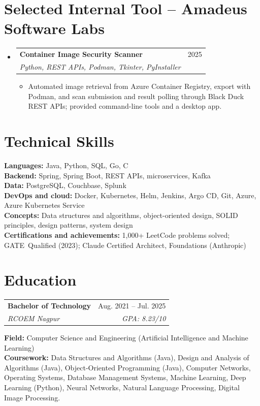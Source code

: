 \documentclass[a4paper,11pt]{article}
\makeatletter
\newcommand{\entry}[4]{\item\begin{tabularx}{\textwidth}{@{}Xr@{}}\textbf{#1}& #2\\\textit{\small #3}&\textit{\small #4}\end{tabularx}\vspace{-5pt}}
\newcommand{\bulletpoint}[1]{\item\small{#1}}
\makeatother
\begin{document}
\section{Selected Internal Tool -- Amadeus Software Labs}
\begin{itemize}[leftmargin=0in,label={}]
  \entry{Container Image Security Scanner}{2025}{Python, REST APIs, Podman, Tkinter, PyInstaller}{}
  \begin{itemize}
    \bulletpoint{Automated image retrieval from Azure Container Registry, export with Podman, and scan submission and result polling through Black Duck REST APIs; provided command-line tools and a desktop app.}
  \end{itemize}
\end{itemize}

\section{Technical Skills}
\small\textbf{Languages:} Java, Python, SQL, Go, C \\
\textbf{Backend:} Spring, Spring Boot, REST APIs, microservices, Kafka \\
\textbf{Data:} PostgreSQL, Couchbase, Splunk \\
\textbf{DevOps and cloud:} Docker, Kubernetes, Helm, Jenkins, Argo CD, Git, Azure, Azure Kubernetes Service \\
\textbf{Concepts:} Data structures and algorithms, object-oriented design, SOLID principles, design patterns, system design \\
\textbf{Certif{}ications and achievements:} 1,000+ LeetCode problems solved; \mbox{GATE Qualif{}ied} (2023); Claude \mbox{Certif{}ied} Architect, Foundations (Anthropic)

\section{Education}
\begin{tabularx}{\textwidth}{@{}Xr@{}}
  \textbf{Bachelor of Technology} & Aug. 2021 -- Jul. 2025 \\
  \textit{\small RCOEM Nagpur} & \textit{\small GPA: 8.23/10} \\
\end{tabularx}
\small\textbf{Field:} Computer Science and Engineering (Artif{}icial Intelligence and Machine Learning)\\
\small\textbf{Coursework:} Data Structures and Algorithms (Java), Design and Analysis of Algorithms (Java), Object-Oriented Programming (Java), Computer Networks, Operating Systems, Database Management Systems, Machine Learning, Deep Learning (Python), Neural Networks, Natural Language Processing, Digital Image Processing.
\end{document}
